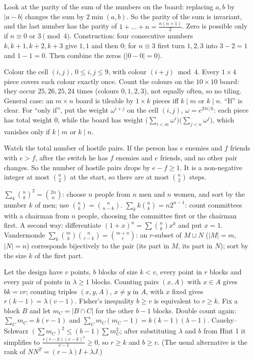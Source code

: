 \documentclass[11pt,a4paper]{article}
\begin{document}

 Look at the parity of the sum of the numbers on the board: replacing $a,b$ by $|a-b|$ changes the sum by $2\min(a,b)$.
 So the parity of the sum is invariant, and the last number has the parity of $1+\dots+n=\frac{n(n+1)}2$. Zero is possible only if $n\equiv0$ or $3\pmod4$.
 Construction: four consecutive numbers $k,k+1,k+2,k+3$ give $1,1$ and then $0$; for $n\equiv3$ first turn $1,2,3$ into $3-2=1$ and $1-1=0$. Then combine the zeros ($|0-0|=0$).

 Colour the cell $(i,j)$, $0\le i,j\le9$, with colour $(i+j)\bmod 4$. Every $1\times4$ piece covers each colour exactly once.
 Count the colours on the $10\times10$ board: they occur $25,26,25,24$ times (colours $0,1,2,3$), not equally often, so no tiling.
 General case: an $m\times n$ board is tileable by $1\times k$ pieces iff $k\mid m$ or $k\mid n$. ``If'' is clear. For ``only if'', put the weight $\omega^{i+j}$ on the cell $(i,j)$, $\omega=e^{2\pi i/k}$: each piece has total weight $0$, while the board has weight $\bigl(\sum_{i<m}\omega^i\bigr)\bigl(\sum_{j<n}\omega^j\bigr)$, which vanishes only if $k\mid m$ or $k\mid n$.

 Watch the total number of hostile pairs.
 If the person has $e$ enemies and $f$ friends with $e>f$, after the switch he has $f$ enemies and $e$ friends, and no other pair changes. So the number of hostile pairs drops by $e-f\ge1$.
 It is a non-negative integer at most $\binom n2$ at the start, so there are at most $\binom n2$ steps.

 $\sum_k\binom nk^2=\binom{2n}n$: choose $n$ people from $n$ men and $n$ women, and sort by the number $k$ of men; use $\binom nk=\binom n{n-k}$.
 $\sum_k k\binom nk=n2^{n-1}$: count committees with a chairman from $n$ people, choosing the committee first or the chairman first. A second way: differentiate $(1+x)^n=\sum\binom nkx^k$ and put $x=1$.
 Vandermonde $\sum_k\binom mk\binom n{r-k}=\binom{m+n}r$: an $r$-subset of $M\sqcup N$ ($|M|=m$, $|N|=n$) corresponds bijectively to the pair (its part in $M$, its part in $N$); sort by the size $k$ of the first part.

 Let the design have $v$ points, $b$ blocks of size $k<v$, every point in $r$ blocks and every pair of points in $\lambda\ge1$ blocks. Counting pairs $(x,A)$ with $x\in A$ gives $bk=vr$; counting triples $(x,y,A)$, $x\ne y$ in $A$, with $x$ fixed gives $r(k-1)=\lambda(v-1)$.
 Fisher's inequality $b\ge v$ is equivalent to $r\ge k$. Fix a block $B$ and let $m_C=|B\cap C|$ for the other $b-1$ blocks. Double count again: $\sum_C m_C=k(r-1)$ and $\sum_C m_C(m_C-1)=k(k-1)(\lambda-1)$.
 Cauchy--Schwarz $(\sum m_C)^2\le(b-1)\sum m_C^2$; after substituting $\lambda$ and $b$ from Hint 1 it simplifies to $\frac{r(r-k)(v-k)^2}{v-1}\ge0$, so $r\ge k$ and $b\ge v$. (The usual alternative is the rank of $NN^T=(r-\lambda)I+\lambda J$.)
\end{document}
